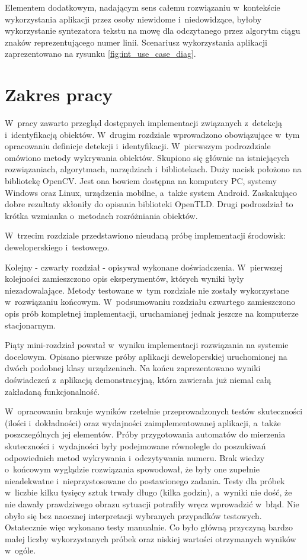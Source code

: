 Elementem dodatkowym, nadającym sens całemu rozwiązaniu w~kontekście
wykorzystania aplikacji przez osoby niewidome i~niedowidzące,
byłoby wykorzystanie syntezatora tekstu na mowę dla 
odczytanego przez algorytm ciągu znaków reprezentującego numer linii. 
Scenariusz wykorzystania aplikacji zaprezentowano na rysunku
\ref{fig:int_use_case_diag}.


\section{Zakres pracy}

W~pracy zawarto przegląd dostępnych implementacji związanych
z~detekcją i~identyfikacją obiektów. W~drugim rozdziale 
wprowadzono obowiązujące
w~tym opracowaniu definicje detekcji i~identyfikacji. 
W~pierwszym podrozdziale omówiono metody wykrywania obiektów.
Skupiono się
głównie na istniejących rozwiązaniach, algorytmach, narzędziach 
i~bibliotekach. Duży nacisk położono na bibliotekę OpenCV. 
Jest ona bowiem dostępna na komputery PC, systemy Windows oraz Linux, 
urządzenia
mobilne, a~także system Android. Zaskakująco dobre
rezultaty skłoniły do opisania biblioteki OpenTLD. 
Drugi podrozdział to krótka wzmianka o~metodach
rozróżniania obiektów.

W~trzecim rozdziale przedstawiono nieudaną próbę implementacji
środowisk: deweloperskiego i~testowego. 

Kolejny - czwarty rozdział - opisywał wykonane doświadczenia.
W~pierwszej kolejności zamieszczono opis 
eksperymentów, których wyniki były niezadowalające. Metody testowane 
w~tym rozdziale nie zostały wykorzystane w~rozwiązaniu końcowym.
W~podsumowaniu rozdziału czwartego zamieszczono opis prób kompletnej
implementacji, uruchamianej jednak jeszcze na komputerze stacjonarnym.

Piąty mini-rozdział powstał w~wyniku implementacji rozwiązania na 
systemie docelowym. Opisano pierwsze próby aplikacji deweloperskiej
uruchomionej na dwóch podobnej klasy urządzeniach. Na końcu
zaprezentowano wyniki doświadczeń z~aplikacją demonstracyjną,
która zawierała już niemal całą zakładaną funkcjonalność.

W~opracowaniu brakuje wyników rzetelnie przeprowadzonych testów
skuteczności (ilości i~dokładności) oraz wydajności zaimplementowanej 
aplikacji, a~także poszczególnych jej elementów. Próby 
przygotowania automatów do mierzenia skuteczności i~wydajności
były podejmowane równolegle do poszukiwań odpowiednich metod
wykrywania i~odczytywania numeru. Brak wiedzy o~końcowym wyglądzie
rozwiązania spowodował, że były one zupełnie nieadekwatne i~nieprzystosowane
do postawionego zadania. Testy dla próbek w~liczbie kilku tysięcy sztuk
trwały długo (kilka godzin), a~wyniki nie dość, że nie dawały prawdziwego
obrazu sytuacji potrafiły wręcz wprowadzić w~błąd.
Nie obyło się bez naocznej interpretacji wybranych przypadków testowych. 
Ostatecznie więc wykonano testy manualnie. Co było główną przyczyną
bardzo małej liczby wykorzystanych próbek oraz niskiej
wartości otrzymanych wyników w~ogóle.
